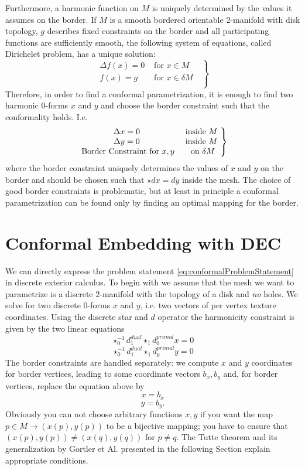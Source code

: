 Furthermore, a harmonic function on $M$ is uniquely determined by the values it assumes on the border. If $M$ is a smooth bordered orientable 2-manifold with disk topology, $g$ describes fixed constraints on the border and all participating functions are sufficiently smooth, the following system of equations, called Dirichelet problem, has a unique solution:
\[\left.\begin{matrix}
 \Delta f(x) = 0 & \text{ for $x \in M$ } \\
  f(x) = g & \text{ for $x \in \delta M$ } \\
\end{matrix}\right\rbrace\]
Therefore, in order to find a conformal parametrization, it is enough to find two harmonic 0-forms $x$ and $y$ and choose the border constraint such that the conformality holds. I.e. 
\begin{equation}\left.\begin{matrix}
 \Delta x = 0 & \text{ inside $ M$ } \\
 \Delta y = 0 & \text{ inside $ M$ } \\
 \text{ Border Constraint for $x,y$} & \text{ on $ \delta M$} \\
\end{matrix}\right\rbrace \label{eq:conformalProblemStatement}\end{equation}
where the border constraint uniquely determines the values of $x$ and $y$ on the border and should be chosen such that $\star dx = dy$ inside the mesh. The choice of good border constraints is problematic, but at least in principle a conformal parametrization can be found only by finding an optimal mapping for the border.


\section{Conformal Embedding with DEC}

We can directly express the problem statement \ref{eq:conformalProblemStatement} in discrete exterior calculus. To begin with we assume that the mesh we want to parametrize is a discrete $2$-manifold with the topology of a disk and \emph{no} holes. We solve for two discrete $0$-forms $x$ and $y$, i.e. two vectors of per vertex texture coordinates. Using the discrete star and $d$ operator the harmonicity constraint is given by the two linear equations
\[\star_0^{-1} d_1^{dual} \star_1 d_0^{primal} x = 0\]
\begin{equation}\star_0^{-1} d_1^{dual} \star_1 d_0^{primal} y = 0 \label{eq:conformal}\end{equation}
The border constraints are handled separately: we compute $x$ and $y$ coordinates for border vertices, leading to some coordinate vectors $b_x, b_y$ and, for border vertices, replace the equation above by
\[ x = b_x\]
\[y = b_y.\]
Obviously you can not choose arbitrary functions $x,y$ if you want the map $p\in M \to (x(p),y(p))$ to be a bijective mapping; you have to ensure that $(x(p),y(p)) \neq (x(q),y(q))$ for $p\neq q$. The Tutte theorem and its generalization by Gortler et Al. \cite{Gortler} presented in the following Section explain appropriate conditions.


